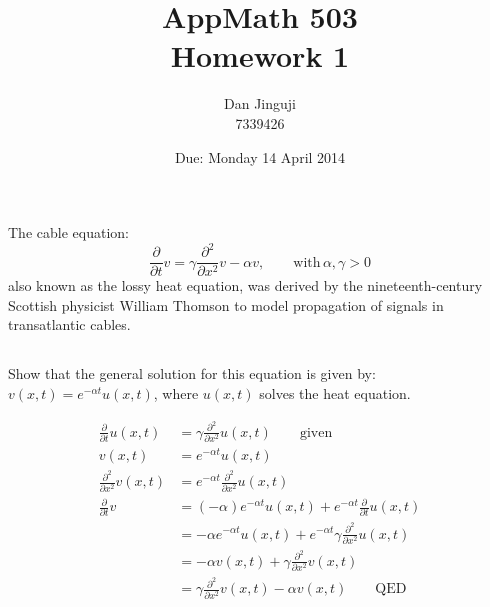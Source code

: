 \documentclass[12pt,USLetter]{article}
\begin{document}
\title{AppMath 503 \\ Homework 1}
\author{Dan Jinguji \\ 7339426}
\date{Due: Monday 14 April 2014}

\maketitle

\renewcommand\thesection {\arabic{section}:}
\renewcommand\thesubsection {(\alph{subsection})}
\newcommand{\vc}[1]{\ensuremath{\,\vec{#1}}}
\newcommand{\pbv}[2]{\ensuremath{\langle{#1}, {#2}\rangle}}
\newcommand{\he}[1]{\ensuremath{\;\hat{e}_{#1}}}
\newcommand{\er}{\he{r}}
\newcommand{\et}{\he{\theta}}
\newcommand{\pd}[1]{\ensuremath{\frac{\partial}{\partial{#1}}}}
\newcommand{\spd}[1]{\ensuremath{\frac{\partial^2}{\partial{#1}^2}}}
\newcommand{\ppd}[2]{\ensuremath{\frac{\partial{#1}}{\partial{#2}}}}
\newcommand{\abs}[1]{\ensuremath{\lvert{#1}\rvert}}
\newcommand{\pr}{\ensuremath{^{\prime}}}
\newcommand{\dpr}{\ensuremath{^{\prime\prime}}}
\newcommand{\Let}{\ensuremath{\mathrm{Let\,}}}
\newcommand{\atan}{\ensuremath{\mathrm{atan2\,}}}
\newcommand{\where}{\ensuremath{\mathrm{where\,}}}
\newcommand{\signtoinf}{\ensuremath{\Sigma_{n=1}^{\infty}}}
\newcommand{\half}{\ensuremath{\tfrac{1}{2}}}

\section{}

The cable equation:
\begin{equation*}
\pd{t}v = \gamma\spd{x}v - \alpha v, \qquad \mathrm{with\,} \alpha,\gamma > 0
\end{equation*}
also known as the lossy heat equation, was derived by the nineteenth-century Scottish physicist William Thomson to model propagation of signals in transatlantic cables.

\subsection{}

Show that the general solution for this equation is given by: $v(x,t) = e^{-\alpha t} u(x,t)$, where $u(x,t)$ solves the heat equation.

\begin{align*}
\pd{t}u(x,t) &= \gamma \spd{x}u(x,t) \qquad \mathrm{given} \\
v(x,t) &= e^{-\alpha t} u(x,t) \\
\spd{x}v(x,t) &= e^{-\alpha t} \spd{x}u(x,t) \\
\pd{t}v &= (-\alpha) e^{-\alpha t} u(x,t) + e^{-\alpha t} \pd{t}u(x,t) \\
&= -\alpha e^{-\alpha t} u(x,t) + e^{-\alpha t} \gamma \spd{x}u(x,t) \\
&= -\alpha v(x,t) + \gamma \spd{x}v(x,t) \\
&= \gamma \spd{x}v(x,t) -\alpha v(x,t) \qquad \mathrm{QED}
\end{align*}
\end{document}
